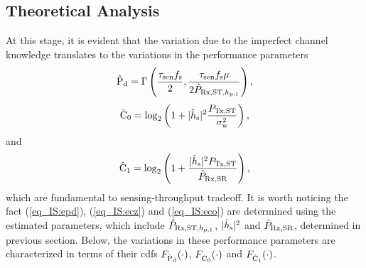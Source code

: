 \subsection{Theoretical Analysis} \label{sec_IS:ana}
At this stage, it is evident that the variation due to the imperfect channel knowledge translates to the variations in the performance parameters
\begin{align}
\epd = \Gamma\left( \frac{\tsen \fsam}{2}, \frac{\tsen \fsam \mu}{2 \eprcvdstpt} \right),  \label{eq_IS:epd} 
\end{align}
\begin{align}
\ecz = \log_2 \left(1 + \ephs \frac{\ptranst}{\npo}\right), 
\label{eq_IS:ecz} 
\end{align}
and
\begin{align}
\eco = \log_2 \left(1 + \frac{\ephs \ptranst }{\eprcvdsr} \right), 
\label{eq_IS:eco} 
\end{align}
which are fundamental to sensing-throughput tradeoff. It is worth noticing the fact (\ref{eq_IS:epd}), (\ref{eq_IS:ecz}) and (\ref{eq_IS:eco}) are determined using the estimated parameters, which include $\hat{P}_{\text{Rx,ST,$h_{\text{p,1}}$}}$, $|\hat{h}_{\text{s}}|^2$ and $\hat{P}_{\text{Rx,SR}}$, determined in previous section. Below, the variations in these performance parameters are characterized in terms of their cdfs $F_{\hat{\text{P}}_{\text{d}}}(\cdot)$, $F_{\hat{\text{C}}_{\text{0}}}(\cdot)$ and $F_{\hat{\text{C}}_{\text{1}}}(\cdot)$.

